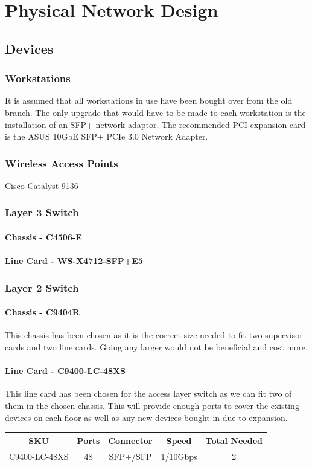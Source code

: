 \chapter{Physical Network Design}

\section{Devices}
\subsection{Workstations}
It is assumed that all workstations in use have been bought over from the old branch. The only upgrade that would have to be made to each workstation is the installation of an SFP+ network adaptor. The recommended PCI expansion card is the ASUS 10GbE SFP+ PCIe 3.0 Network Adapter.
\subsection{Wireless Access Points}
Cisco Catalyst 9136
\subsection{Layer 3 Switch}
\subsubsection{Chassis - C4506-E}
\subsubsection{Line Card - WS-X4712-SFP+E5}
\subsection{Layer 2 Switch}
\subsubsection{Chassis - C9404R}
This chassis has been chosen as it is the correct size needed to fit two supervisor cards and two line cards. Going any larger would not be beneficial and cost more. 
\subsubsection{Line Card - C9400-LC-48XS}
This line card has been chosen for the access layer switch as we can fit two of them in the chosen chassis. This will provide enough ports to cover the existing devices on each floor as well as any new devices bought in due to expansion.
\begin{table}[ht!]
    \begin{tabular}{|ccccc|}
    \hline
    \multicolumn{1}{|c|}{SKU} & \multicolumn{1}{c|}{Ports} & \multicolumn{1}{c|}{Connector} & \multicolumn{1}{c|}{Speed} & Total Needed \\ \hline
    C9400-LC-48XS             & 48                         & SFP+/SFP                       & 1/10Gbps                   & 2            \\ \hline
    \end{tabular}
\end{table}
